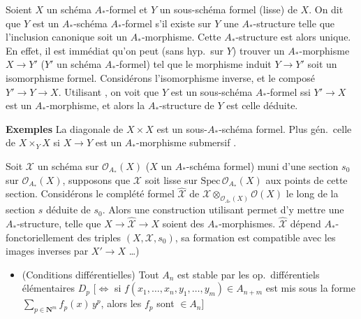 \documentclass[11pt,a4paper]{article}
\begin{document}

Soient $X$ un schéma $A_*$-formel et $Y$ un sous-schéma formel (lisse) de $X$.
 On dit que $Y$ est un  $A_*$-schéma $A_*$-formel s'il
existe sur $Y$ une $A_*$-structure telle que l'inclusion canonique soit un
$A_*$-morphisme. Cette $A_*$-structure est alors unique. En effet, il est
immédiat qu'on peut (sans hyp.\ sur $Y$) trouver un $A_*$-morphisme
$X \to Y'$ ($Y'$ un schéma $A_*$-formel) tel que le morphisme induit
$Y \to Y'$ soit un isomorphisme formel.  Considérons
l'isomorphisme inverse, et le composé $Y' \to Y \to X$. Utilisant
, on voit que \struck{\ill{}} $Y$ est un sous-schéma $A_*$-formel
ssi $Y' \to X$ est un $A_*$-morphisme, et alors la $A_*$-structure de $Y$ est
celle déduite.

\textbf{Exemples} La diagonale de $X \times X$ est un sous-$A_*$-schéma formel.
Plus gén.\ celle de $X \times_Y X$ si $X \to Y$ est un $A_*$-morphisme submersif
.


Soit $\mathcal{X}$ un schéma sur $\mathcal{O}_{A_*}(X)$ ($X$ un $A_*$-schéma
formel) muni d'une section $s_0$ sur $\mathcal{O}_{A_*}(X)$, supposons que
$\mathcal{X}$ soit lisse sur $\mathrm{Spec}\, \mathcal{O}_{A_*}(X)$ aux points de
cette section. Considérons le complété formel $\widehat{\mathcal{X}}$ de
$\mathcal{X} \otimes_{\mathcal{O}_{A_*}(X)} \mathcal{O}(X)$ le long de la section
$s$ déduite de $s_0$. Alors une construction utilisant  permet
d'y mettre une $A_*$-structure, telle que
$X \to \widehat{\mathcal{X}} \to X$ soient des $A_*$-morphismes.
\struck{\ill{}} $\widehat{\mathcal{X}}$ dépend $A_*$-fonctoriellement des triples
$(X, \mathcal{X}, s_0)$, sa formation est compatible avec les images inverses
par $X' \to X$ \ldots)


\begin{itemize}
  \item[d)] (Conditions différentielles) Tout $A_n$ est stable par
    les op.\ différentiels élémentaires $D_p$
    [$\Leftrightarrow$ si $f(x_1, \ldots, x_n, y_1, \ldots, y_m) \in A_{n+m}$ est
    mis sous la forme $\sum_{p \in \mathbf{N}^m} f_p(x)\, y^p$, alors les $f_p$
    sont $\in A_n$]
\end{itemize}
\end{document}
